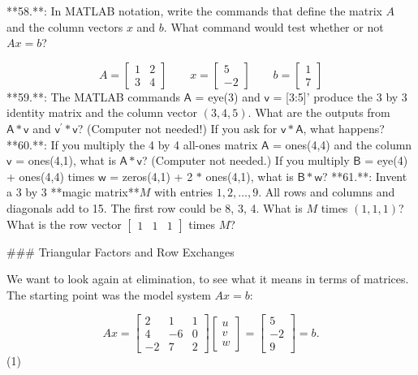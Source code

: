 

**58.**: In MATLAB notation, write the commands that define the matrix \(A\) and the column vectors \(x\) and \(b\). What command would test whether or not \(Ax=b\)?

\[A=\begin{bmatrix}1&2\\ 3&4\end{bmatrix}\qquad x=\begin{bmatrix}5\\ -2\end{bmatrix}\qquad b=\begin{bmatrix}1\\ 7\end{bmatrix}\]
**59.**: The MATLAB commands \(\mathsf{A}\) = eye(3) and \(\mathsf{v}\) = [3:5]' produce the 3 by 3 identity matrix and the column vector \((3,4,5)\). What are the outputs from \(\mathsf{A}\ast\mathsf{v}\) and \(\mathsf{v}^{\prime}\ast\mathsf{v}\)? (Computer not needed!) If you ask for \(\mathsf{v}\ast\mathsf{A}\), what happens?
**60.**: If you multiply the 4 by 4 all-ones matrix \(\mathsf{A}\) = ones(4,4) and the column \(\mathsf{v}\) = ones(4,1), what is \(\mathsf{A}\ast\mathsf{v}\)? (Computer not needed.) If you multiply \(\mathsf{B}\) = eye(4) + ones(4,4) times \(\mathsf{w}\) = zeros(4,1) + 2 \(\ast\) ones(4,1), what is \(\mathsf{B}\ast\mathsf{w}\)?
**61.**: Invent a 3 by 3 **magic matrix**\(M\) with entries \(1,2,\ldots,9\). All rows and columns and diagonals add to 15. The first row could be 8, 3, 4. What is \(M\) times \((1,1,1)\)? What is the row vector \(\begin{bmatrix}1&1&1\end{bmatrix}\) times \(M\)?

### Triangular Factors and Row Exchanges

We want to look again at elimination, to see what it means in terms of matrices. The starting point was the model system \(Ax=b\):

\[Ax=\begin{bmatrix}2&1&1\\ 4&-6&0\\ -2&7&2\end{bmatrix}\begin{bmatrix}u\\ v\\ w\end{bmatrix}=\begin{bmatrix}5\\ -2\\ 9\end{bmatrix}=b.\] (1)

